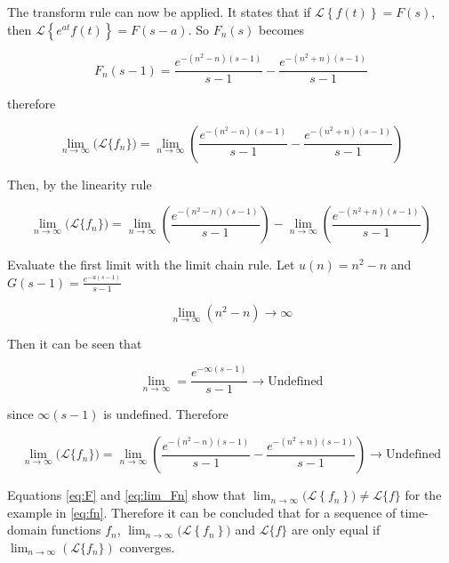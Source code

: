 \documentclass[a4paper,10pt,reqno]{amsart}
\numberwithin{equation}{section}
\newcommand{\lap}{\mathscr{L}}
\begin{document}
The transform rule can now be applied. It states that if $\lap\left\{f(t)\right\} = F(s)$, then $\lap\left\{e^{at} f(t)\right\} = F(s - a)$. So $F_n(s)$ becomes

\begin{equation}
     F_n(s - 1) = \frac{e^{-(n^2 - n)(s-1)}}{s-1} - \frac{e^{-(n^2 + n)(s-1)}}{s-1}
\end{equation}
\vspace{1pt}

therefore

\begin{equation}
     \lim_{n \to \infty} \big(\lap\{f_n\}\big) = \lim_{n \to \infty} \left(\frac{e^{-(n^2 - n)(s-1)}}{s-1} - \frac{e^{-(n^2 + n)(s-1)}}{s-1}\right)
\end{equation}
\vspace{1pt}

Then, by the linearity rule

\begin{equation}
     \lim_{n \to \infty} \big(\lap\{f_n\}\big) = \lim_{n \to \infty} \left(\frac{e^{-(n^2 - n)(s-1)}}{s-1}\right) - \lim_{n \to \infty}\left(\frac{e^{-(n^2 + n)(s-1)}}{s-1}\right)
\end{equation}
\vspace{1pt}

Evaluate the first limit with the limit chain rule. Let $u(n) = n^2 - n$ and $G(s - 1) = \frac{e^{-u(s - 1)}}{s - 1}$

\begin{equation}
     \lim_{n \to \infty} (n^2 - n) \to \infty
\end{equation}
\vspace{1pt}

Then it can be seen that

\begin{equation}
     \lim_{n \to \infty} = \frac{e^{-\infty(s - 1)}}{s - 1} \to \text{Undefined}
\end{equation}
\vspace{1pt}

since $\infty(s - 1)$ is undefined. Therefore

\begin{equation}\label{eq:lim_Fn}
     \lim_{n \to \infty} \big(\lap\{f_n\}\big) = \lim_{n \to \infty} \left(\frac{e^{-(n^2 - n)(s-1)}}{s-1} - \frac{e^{-(n^2 + n)(s-1)}}{s-1}\right) \to \text{Undefined}
\end{equation}
\vspace{1pt}

Equations \eqref{eq:F} and \eqref{eq:lim_Fn} show that $\lim_{n \to \infty} \big(\lap\left\{f_n\right\}\big) \neq \lap\{f\}$ for the example in \eqref{eq:fn}. Therefore it can be concluded that for a sequence of time-domain functions $f_n$, $\lim_{n \to \infty} \big(\lap\left\{f_n\right\}\big)$ and $\lap\{f\}$ are only equal if $\lim_{n \to \infty} (\lap\{f_n\})$ converges.
\end{document}
